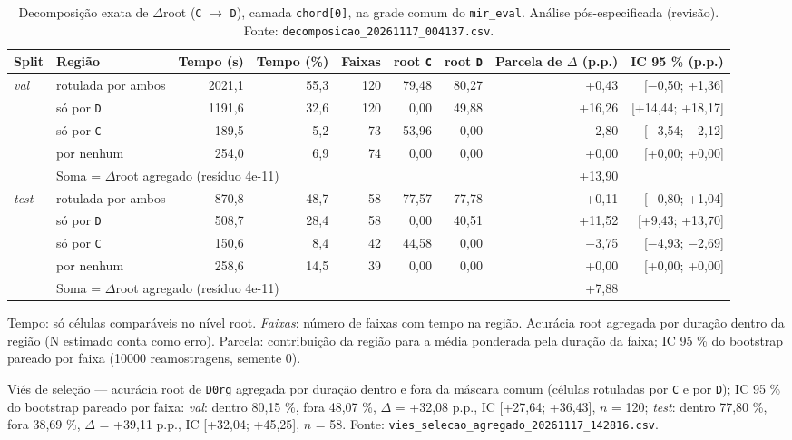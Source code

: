 \begin{table}[t]
  \centering
  \caption{Decomposição exata de $\Delta$root (\texttt{C} $\to$ \texttt{D}), camada \texttt{chord[0]}, na grade comum do \texttt{mir\_eval}. Análise pós-especificada (revisão). Fonte: \texttt{decomposicao\_20261117\_004137.csv}.}
  \label{tab:decomposicao}
  \footnotesize
  \begin{tabular}{llrrrrrrr}
    \toprule
    Split & Região & Tempo (s) & Tempo (\%) & Faixas & root \texttt{C} & root \texttt{D} & Parcela de $\Delta$ (p.p.) & IC 95 \% (p.p.) \\
    \midrule
    \emph{val} & rotulada por ambos & 2021,1 & 55,3 & 120 & 79,48 & 80,27 & +0,43 & [$-$0,50; +1,36] \\
     & só por \texttt{D} & 1191,6 & 32,6 & 120 & 0,00 & 49,88 & +16,26 & [+14,44; +18,17] \\
     & só por \texttt{C} & 189,5 & 5,2 & 73 & 53,96 & 0,00 & $-$2,80 & [$-$3,54; $-$2,12] \\
     & por nenhum & 254,0 & 6,9 & 74 & 0,00 & 0,00 & +0,00 & [+0,00; +0,00] \\
     & \multicolumn{6}{l}{Soma = $\Delta$root agregado (resíduo 4e-11)} & +13,90 & \\
    \midrule
    \emph{test} & rotulada por ambos & 870,8 & 48,7 & 58 & 77,57 & 77,78 & +0,11 & [$-$0,80; +1,04] \\
     & só por \texttt{D} & 508,7 & 28,4 & 58 & 0,00 & 40,51 & +11,52 & [+9,43; +13,70] \\
     & só por \texttt{C} & 150,6 & 8,4 & 42 & 44,58 & 0,00 & $-$3,75 & [$-$4,93; $-$2,69] \\
     & por nenhum & 258,6 & 14,5 & 39 & 0,00 & 0,00 & +0,00 & [+0,00; +0,00] \\
     & \multicolumn{6}{l}{Soma = $\Delta$root agregado (resíduo 4e-11)} & +7,88 & \\
    \bottomrule
  \end{tabular}
  \vspace{2pt}
  \parbox{\linewidth}{\footnotesize Tempo: só células comparáveis no nível root. \emph{Faixas}: número de faixas com tempo na região. Acurácia root agregada por duração dentro da região (N estimado conta como erro). Parcela: contribuição da região para a média ponderada pela duração da faixa; IC 95 \% do bootstrap pareado por faixa (10000 reamostragens, semente 0).}
  \vspace{2pt}
  \parbox{\linewidth}{\footnotesize Viés de seleção --- acurácia root de \texttt{D0rg} agregada por duração dentro e fora da máscara comum (células rotuladas por \texttt{C} e por \texttt{D}); IC 95 \% do bootstrap pareado por faixa: \emph{val}: dentro 80,15 \%, fora 48,07 \%, $\Delta$ = +32,08 p.p., IC [+27,64; +36,43], $n$ = 120; \emph{test}: dentro 77,80 \%, fora 38,69 \%, $\Delta$ = +39,11 p.p., IC [+32,04; +45,25], $n$ = 58. Fonte: \texttt{vies\_selecao\_agregado\_20261117\_142816.csv}.}
\end{table}
